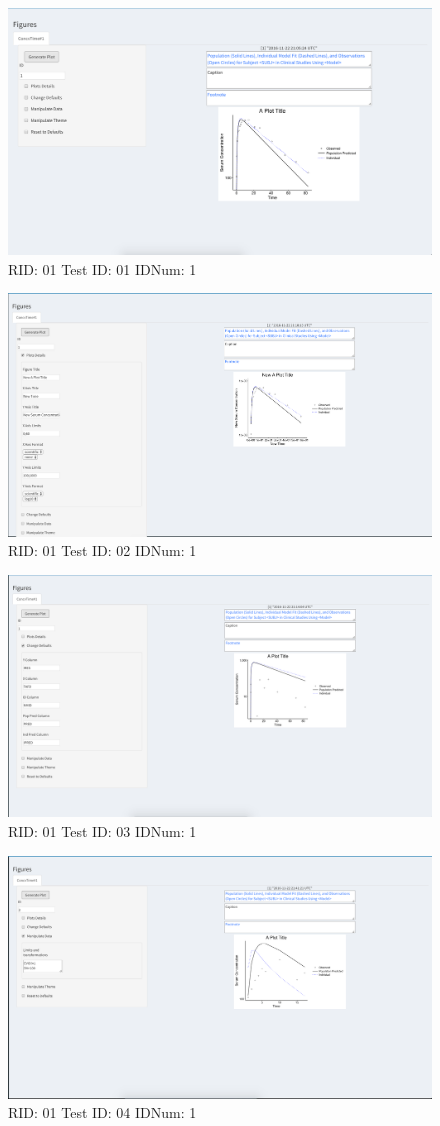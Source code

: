 \begin{figure}[H]
\includegraphics[width=.8\textwidth]{screencaps/01-01-1.png}
\caption{RID: 01 Test ID: 01 IDNum: 1}
\end{figure}
\begin{figure}[H]
\includegraphics[width=.8\textwidth]{screencaps/01-02-1.png}
\caption{RID: 01 Test ID: 02 IDNum: 1}
\end{figure}
\begin{figure}[H]
\includegraphics[width=.8\textwidth]{screencaps/01-03-1.png}
\caption{RID: 01 Test ID: 03 IDNum: 1}
\end{figure}
\begin{figure}[H]
\includegraphics[width=.8\textwidth]{screencaps/01-04-1.png}
\caption{RID: 01 Test ID: 04 IDNum: 1}
\end{figure}
